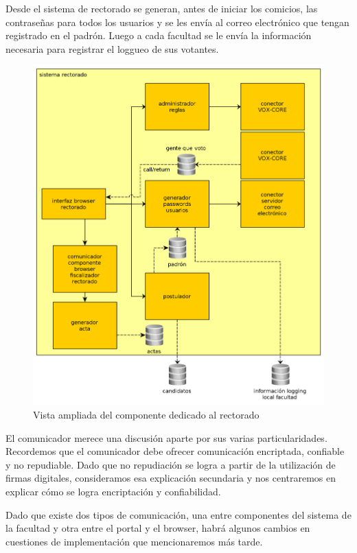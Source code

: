 Desde el sistema de rectorado se generan, antes de iniciar los comicios, las contraseñas para todos los usuarios y se les envía al correo electrónico que tengan registrado en el padrón. Luego a cada facultad se le envía la información necesaria para registrar el loggueo de sus votantes.

\begin{figure}[H]
	\begin{center}
		\includegraphics[scale=0.26]{../diagramas/sistemaRectorado.png}
		\caption{Vista ampliada del componente dedicado al rectorado}
	\end{center} 
\end{figure} 

El comunicador merece una discusión aparte por sus varias particularidades. Recordemos que el comunicador debe ofrecer comunicación encriptada, confiable y no repudiable. Dado que no repudiación se logra a partir de la utilización de firmas digitales, consideramos esa explicación secundaria y nos centraremos en explicar cómo se logra encriptación y confiabilidad.

Dado que existe dos tipos de comunicación, una entre componentes del sistema de la facultad y otra entre el portal y el browser, habrá algunos cambios en cuestiones de implementación que mencionaremos más tarde. %

